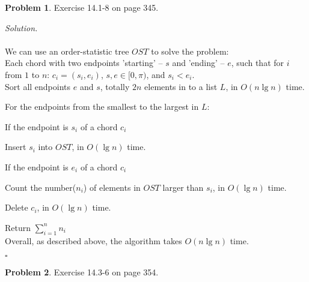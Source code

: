 \documentclass[11pt]{article}
\theoremstyle{definition}
\newtheorem{problem}{Problem}
\newenvironment{solution}{\noindent\emph{Solution.}}{\hfill$\square$}
\newcommand\tab[1][1cm]{\hspace*{#1}}
\begin{document}
\clearpage






\begin{problem}
Exercise 14.1-8 on page 345.
\end{problem}

\begin{solution}
\\ \\
We can use an order-statistic tree $OST$ to solve the problem:\\

    Each chord with two endpoints 'starting' -- $s$ and 'ending' -- $e$, such that for $i$ from $1$ to $n$: $c_i= (s_i, e_i)$, $s,e \in [0, \pi) $, and $s_i < e_i$.\\
    
    Sort all endpoints $e$ and $s$, totally $2n$ elements in to a list $L$, in $O(n \lg n)$ time.
    
    For the endpoints from the smallest to the largest in $L$:
    
    \tab If the endpoint is $s_i$ of a chord $c_i$
    
    \tab\tab Insert $s_i$ into $OST$, in $O(\lg n)$ time.
    
    \tab If the endpoint is $e_i$ of a chord $c_i$
    
    \tab\tab Count the number($n_i$) of elements in $OST$ larger than $s_i$, in $O(\lg n)$ time.
    
    \tab\tab Delete $c_i$, in $O(\lg n)$ time.
    
    Return $\sum_{i=1}^n n_i$ \\
    
    Overall, as described above, the algorithm takes  $O(n \lg n)$ time.
    
    


\end{solution}

\newpage



\begin{problem}Exercise 14.3-6 on page 354. 
\end{problem}
\end{document}
